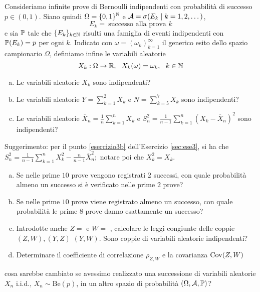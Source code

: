 Consideriamo infinite prove di Bernoulli indipendenti con probabilità di successo $p\in (0,1)$. Siano quindi $\Omega =\{0,1\}^{\mathbb{N}}$ e $\mathcal{A} =\sigma (E_{k} \mid k=1,2,\dots)$,
\begin{equation*}
E_{k} =\ \text{successo alla prova } k
\end{equation*}
e sia $\mathbb{P}$ tale che $\{E_{k}\}_{k\in \mathbb{N}}$ risulti una famiglia di eventi indipendenti con $\mathbb{P}(E_{k}) =p$ per ogni $k$. Indicato con $\omega =(\omega_{k})_{k=1}^{\infty }$ il generico esito dello spazio campionario $\Omega $, definiamo infine le variabili aleatorie
\begin{equation*}
X_{k} :\Omega \rightarrow \mathbb{R} ,\ \ X_{k} (\omega)=\omega_{k} ,\ \ k\in \mathbb{N}
\end{equation*}
\begin{enumerate}[a)]
	\item Le variabili aleatorie $X_{k}$ sono indipendenti?
	\item Le variabili aleatorie $Y=\sum_{k=1}^{2} X_{k}$ e $N=\sum_{k=5}^{7} X_{k}$ sono indipendenti?
	\item Le variabili aleatorie $\overline{X}_{n} =\frac{1}{n}\sum_{k=1}^{n} X_{k}$ e $S_{n}^{2} =\frac{1}{n-1}\sum_{k=1}^{n}(X_{k} -\overline{X}_{n})^{2}$ sono indipendenti?
\end{enumerate}
Suggerimento: per il punto \ref{esercizio3b} dell'Esercizio \ref{sec:ese3}, si ha che $S_{n}^{2} =\frac{1}{n-1}\sum_{k=1}^{n} X_{k}^{2} -\frac{n}{n-1}\overline{X}_{n}^{2} ;$ notare poi che $X_{k}^{2} =X_{k}$.
\begin{enumerate}[a),resume]
	\item Se nelle prime $10$ prove vengono registrati $2$ successi, con quale probabilità almeno un successo si è verificato nelle prime $2$ prove?
	\item Se nelle prime $10$ prove viene registrato almeno un successo, con quale probabilità le prime $8$ prove danno esattamente un successo?
	\item Introdotte anche $Z=$  e $W=$ , calcolare le leggi congiunte delle coppie $(Z,W),(Y,Z)$ $(Y,W).$ Sono coppie di variabili aleatorie indipendenti?
	\item Determinare il coefficiente di correlazione $\rho _{Z,W}$ e la covarianza $\operatorname{Cov} (Z,W)$
\end{enumerate}
cosa sarebbe cambiato se avessimo realizzato una successione di variabili aleatorie $X_{n}$ i.i.d., $X_{n} \sim \mathrm{Be} (p)$, in un altro spazio di probabilità $(\Omega,\mathcal{A},\mathbb{P})$?

